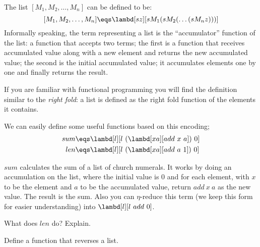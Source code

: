 \documentclass[../../../include/open-logic-section]{subfiles}
\begin{document}

The list $[M_1, M_2, \ldots, M_n]$ can be defined to be:
\[
  [M_1, M_2, \ldots, M_n] \eqs \lambd[sz][s M_1 (s M_2 (\ldots (s M_n z)))]
\]
Informally speaking, the term representing a list is the
``accumulator'' function of the list: a function that accepts two
terms; the first is a function that receives accumulated value along
with a new element and returns the new accumulated value; the second
is the initial accumulated value; it accumulates elements one by one
and finally returns the result.

\begin{digress}
  If you are familiar with functional programming you will find the
  definition similar to the \emph{right fold}: a list is defined as
  the right fold function of the elements it contains.
\end{digress}

We can easily define some useful functions based on this encoding; 
\begin{align*}
  {sum} &\eqs \lambd[l][l ~ (\lambd[xa][add ~ x ~ a])~  0]\\
  len &\eqs \lambd[l][l ~ (\lambd[xa][add ~ a ~ 1]) ~ 0]
\end{align*}

$sum$ calculates the sum of a list of church numerals. It works by
doing an accumulation on the list, where the initial value is $0$ and
for each element, with $x$ to be the element and $a$ to be the
accumulated value, return $add ~ x ~ a$ as the new value. The result
is the sum. Also you can $\eta$-reduce this term (we keep this form for
easier understanding) into $\lambd[l][l ~ add ~ 0]$.

\begin{prob}
  What does $len$ do? Explain.
\end{prob}

\begin{prob}
  Define a function that reverses a list.
\end{prob}
\end{document}
